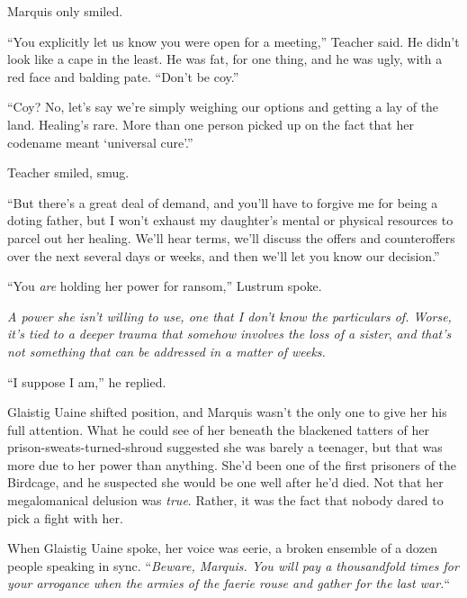 Marquis only smiled.



``You explicitly let us know you were open for a meeting,'' Teacher said.  He didn't look like a cape in the least.  He was fat, for one thing, and he was ugly, with a red face and balding pate.  ``Don't be coy.''



``Coy?  No, let's say we're simply weighing our options and getting a lay of the land.  Healing's rare.  More than one person picked up on the fact that her codename meant `universal cure'.''



Teacher smiled, smug.



``But there's a great deal of demand, and you'll have to forgive me for being a doting father, but I won't exhaust my daughter's mental or physical resources to parcel out her healing.  We'll hear terms, we'll discuss the offers and counteroffers over the next several days or weeks, and then we'll let you know our decision.''



``You \emph{are} holding her power for ransom,'' Lustrum spoke.



\emph{A power she isn't willing to use, one that I don't know the particulars of.  Worse, it's tied to a deeper trauma that somehow involves the loss of a sister}, \emph{and that's not something that can be addressed in a matter of weeks.}



``I suppose I am,'' he replied.



Glaistig Uaine shifted position, and Marquis wasn't the only one to give her his full attention.  What he could see of her beneath the blackened tatters of her prison-sweats-turned-shroud suggested she was barely a teenager, but that was more due to her power than anything.  She'd been one of the first prisoners of the Birdcage, and he suspected she would be one well after he'd died.  Not that her megalomanical delusion was \emph{true}.  Rather, it was the fact that nobody dared to pick a fight with her.



When Glaistig Uaine spoke, her voice was eerie, a broken ensemble of a dozen people speaking in sync.  ``\emph{Beware, Marquis.  You will pay a thousandfold times for your arrogance when the armies of the faerie rouse and gather for the last war.}``




